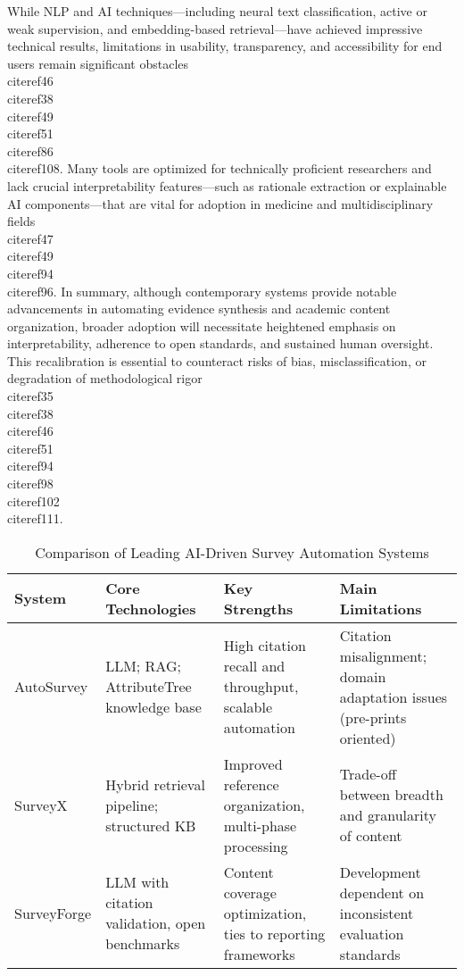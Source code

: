 \documentclass[11pt]{article}
\begin{document}
While NLP and AI techniques—including neural text classification, active or weak supervision, and embedding-based retrieval—have achieved impressive technical results, limitations in usability, transparency, and accessibility for end users remain significant obstacles \\cite{ref46}\\cite{ref38}\\cite{ref49}\\cite{ref51}\\cite{ref86}\\cite{ref108}. Many tools are optimized for technically proficient researchers and lack crucial interpretability features—such as rationale extraction or explainable AI components—that are vital for adoption in medicine and multidisciplinary fields \\cite{ref47}\\cite{ref49}\\cite{ref94}\\cite{ref96}. In summary, although contemporary systems provide notable advancements in automating evidence synthesis and academic content organization, broader adoption will necessitate heightened emphasis on interpretability, adherence to open standards, and sustained human oversight. This recalibration is essential to counteract risks of bias, misclassification, or degradation of methodological rigor \\cite{ref35}\\cite{ref38}\\cite{ref46}\\cite{ref51}\\cite{ref94}\\cite{ref98}\\cite{ref102}\\cite{ref111}.

\begin{table}[ht]
\centering
\caption{Comparison of Leading AI-Driven Survey Automation Systems}
\label{tab:method_comparison}
\begin{tabular}{|l|p{2.7cm}|p{3cm}|p{3.2cm}|}
\hline
\textbf{System} & \textbf{Core Technologies} & \textbf{Key Strengths} & \textbf{Main Limitations} \\
\hline
AutoSurvey & LLM; RAG; AttributeTree knowledge base & High citation recall and throughput, scalable automation & Citation misalignment; domain adaptation issues (pre-prints oriented) \\
\hline
SurveyX    & Hybrid retrieval pipeline; structured KB & Improved reference organization, multi-phase processing & Trade-off between breadth and granularity of content \\
\hline
SurveyForge & LLM with citation validation, open benchmarks & Content coverage optimization, ties to reporting frameworks & Development dependent on inconsistent evaluation standards \\
\hline
\end{tabular}
\end{table}
\end{document}
